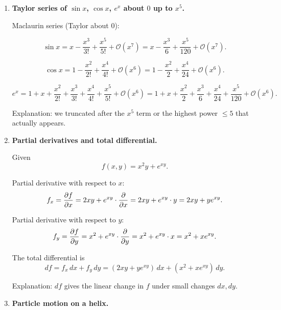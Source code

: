 \documentclass[12pt]{article}
\begin{document}
\begin{enumerate}
Now compute the function values:
\begin{align*}
f(1) &= 1^3 -6(1)^2 + 9(1) +1
= 1 -6 +9 +1
= 5, \\
f(3) &= 3^3 -6(3)^2 + 9(3) +1
= 27 -54 +27 +1
= 1.
\end{align*}

Conclusion:
\[
  \text{local maximum: } f(1)=5 \text{ at } x=1,
  \qquad
  \text{local minimum: } f(3)=1 \text{ at } x=3.
\]

Explanation: the sign of $f''$ at the critical point determines if the point is a max ($f''<0$) or a min ($f''>0$).


\item \textbf{Taylor series of $\sin x$, $\cos x$, $e^x$ about $0$ up to $x^5$.}

Maclaurin series (Taylor about $0$):

\[
\sin x = x - \frac{x^3}{3!} + \frac{x^5}{5!} + \mathcal{O}(x^7)
= x - \frac{x^3}{6} + \frac{x^5}{120} + \mathcal{O}(x^7).
\]

\[
\cos x = 1 - \frac{x^2}{2!} + \frac{x^4}{4!} + \mathcal{O}(x^6)
= 1 - \frac{x^2}{2} + \frac{x^4}{24} + \mathcal{O}(x^6).
\]

\[
e^x = 1 + x + \frac{x^2}{2!} + \frac{x^3}{3!} + \frac{x^4}{4!} + \frac{x^5}{5!} + \mathcal{O}(x^6)
= 1 + x + \frac{x^2}{2} + \frac{x^3}{6} + \frac{x^4}{24} + \frac{x^5}{120} + \mathcal{O}(x^6).
\]

Explanation: we truncated after the $x^5$ term or the highest power $\le 5$ that actually appears.


\item \textbf{Partial derivatives and total differential.}

Given
\[
  f(x,y) = x^2 y + e^{xy}.
\]

Partial derivative with respect to $x$:
\[
  f_x = \pdv{f}{x}
  = 2x y + e^{xy} \cdot \pdv{}{x}(xy)
  = 2xy + e^{xy} \cdot y
  = 2xy + y e^{xy}.
\]

Partial derivative with respect to $y$:
\[
  f_y = \pdv{f}{y}
  = x^2 + e^{xy} \cdot \pdv{}{y}(xy)
  = x^2 + e^{xy} \cdot x
  = x^2 + x e^{xy}.
\]

The total differential is
\[
  df = f_x \, dx + f_y \, dy
  = (2xy + y e^{xy})\,dx + (x^2 + x e^{xy})\,dy.
\]

Explanation: $df$ gives the linear change in $f$ under small changes $dx,dy$.


\item \textbf{Particle motion on a helix.}


\end{enumerate}
\end{document}
